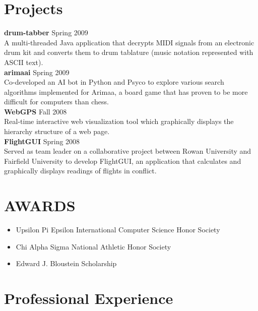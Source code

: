 \documentclass[10pt]{article}
\begin{document}
{\begin{minipage}[t]{0.44\textwidth}
\section {Projects}
  {\bf drum-tabber} \hfill Spring 2009 \\
    A multi-threaded Java application that decrypts MIDI signals from an electronic drum kit
    and converts them to drum tablature (music notation represented with ASCII text). \\

  {\bf arimaai} \hfill Spring 2009 \\
    Co-developed an AI bot in Python and Psyco to explore various search algorithms implemented
    for Arimaa, a board game that has proven to be more difficult for computers than chess. \\
    
  {\bf WebGPS} \hfill Fall 2008 \\
    Real-time interactive web visualization tool which 
	graphically displays the hierarchy structure of a web page. \\

  {\bf FlightGUI} \hfill Spring 2008 \\
    Served as team leader on a collaborative project between Rowan University and Fairfield University
    to develop FlightGUI, an application that calculates and graphically displays readings of flights in conflict. \\
   
\section{AWARDS}
  \begin{itemize}  \itemsep -2pt \normalsize
    \item Upsilon Pi Epsilon International Computer Science Honor Society
    \item Chi Alpha Sigma National Athletic Honor Society
    \item Edward J. Bloustein Scholarship
  \end{itemize}

\end{minipage}
\hfill
\begin{minipage}[t]{0.52\textwidth}

	\vspace{0pt}	%


\section{Professional Experience}


\end{minipage}}
\end{document}
